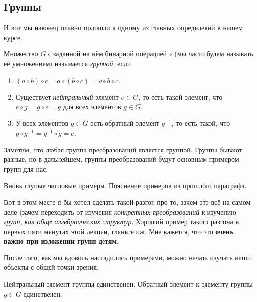 \subsection{Группы}

	И вот мы наконец плавно подошли к одному из главных определений в нашем курсе. 

	\begin{definition} 
		Множество $G$ с заданной на нём бинарной операцией $\circ$ (мы часто будем называть её умножением) называется \emph{группой}, если 
		\begin{enumerate}
			\item $(a \circ b) \circ c = a \circ (b \circ c) = a \circ b \circ c$. 
			\item Существует \emph{нейтральный} элемент $e \in G$, то есть такой элемент, что $e \circ g = g \circ e = g$ для всех элементов $g \in G$. 
			\item У всех элементов $g \in G$ есть обратный элемент $g^{-1}$, то есть такой, что $g \circ g^{-1} = g^{-1} \circ g = e$.
		\end{enumerate}
	\end{definition}

	\begin{remark}
		Заметим, что любая группа преобразований является группой. Группы бывают разные, но в дальнейшем, группы преобразований будут основным примером групп для нас. 
	\end{remark}

	\begin{example}
		Вновь глупые числовые примеры. Пояснение примеров из прошлого параграфа. 
	\end{example}

	\begin{remark}
		Вот в этом месте я бы хотел сделать такой разгон про то, зачем это всё на самом деле (зачем переходить от изучения \emph{конкретных преобразований} к изучению \emph{групп, как обще алгебраических структур}. Хороший пример такого разгона в первых пяти минутах \href{https://www.youtube.com/watch?v=NKZ_2EzHaSI}{этой лекции}, гляньте пж. Мне кажется, что это \bf{очень важно} при изложении групп детям. 
	\end{remark} 

	После того, как мы вдоволь насладились примерами, можно начать изучать наши объекты с общей точки зрения. 

	\begin{observation} 
		Нейтральный элемент группы единственен. Обратный элемент к элементу группы $g \in G$ единственен. 
	\end{observation}

